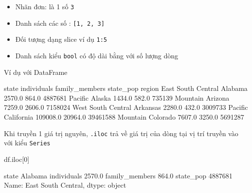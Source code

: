 \documentclass[
]{book}
\newenvironment{Shaded}{\begin{snugshade}}{\end{snugshade}}
\newcommand{\DecValTok}[1]{\textcolor[rgb]{0.00,0.00,0.81}{#1}}
\newcommand{\FloatTok}[1]{\textcolor[rgb]{0.00,0.00,0.81}{#1}}
\newcommand{\NormalTok}[1]{#1}
\begin{document}
\begin{itemize}
\item
  Nhãn đơn: là 1 số \texttt{3}
\item
  Danh sách các số : \texttt{{[}1,\ 2,\ 3{]}}
\item
  Đối tượng dạng slice ví dụ \texttt{1:5}
\item
  Danh sách kiểu \texttt{bool} có độ dài bằng với số lượng dòng
\end{itemize}

Ví dụ với DataFrame

\begin{Shaded}
\begin{Highlighting}[]
\NormalTok{                         state  individuals  family\_members  state\_pop}
\NormalTok{region                                                                }
\NormalTok{East South Central     Alabama       }\FloatTok{2570.0}           \FloatTok{864.0}    \DecValTok{4887681}
\NormalTok{Pacific                 Alaska       }\FloatTok{1434.0}           \FloatTok{582.0}     \DecValTok{735139}
\NormalTok{Mountain               Arizona       }\FloatTok{7259.0}          \FloatTok{2606.0}    \DecValTok{7158024}
\NormalTok{West South Central    Arkansas       }\FloatTok{2280.0}           \FloatTok{432.0}    \DecValTok{3009733}
\NormalTok{Pacific             California     }\FloatTok{109008.0}         \FloatTok{20964.0}   \DecValTok{39461588}
\NormalTok{Mountain              Colorado       }\FloatTok{7607.0}          \FloatTok{3250.0}    \DecValTok{5691287}
\end{Highlighting}
\end{Shaded}

Khi truyền 1 giá trị nguyên, \texttt{.iloc} trả về giá trị của dòng tại vị trí truyền vào với kiểu \texttt{Series}

\begin{Shaded}
\begin{Highlighting}[]
\NormalTok{df.iloc[}\DecValTok{0}\NormalTok{]}
\end{Highlighting}
\end{Shaded}

\begin{Shaded}
\begin{Highlighting}[]
\NormalTok{state             Alabama}
\NormalTok{individuals        2570.0}
\NormalTok{family\_members      864.0}
\NormalTok{state\_pop         4887681}
\NormalTok{Name: East South Central, dtype: object}
\end{Highlighting}
\end{Shaded}
\end{document}
